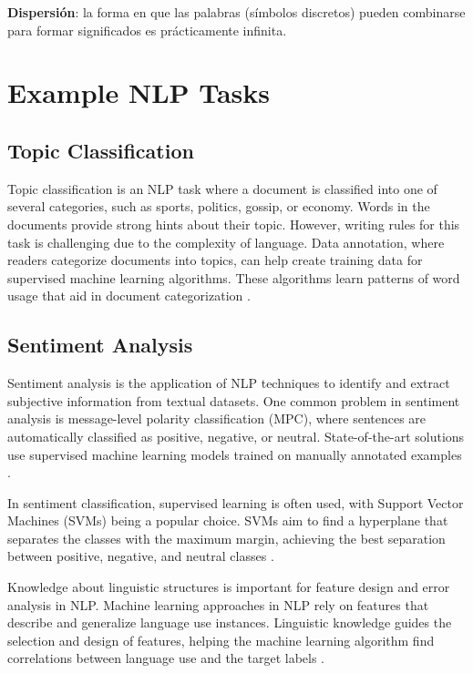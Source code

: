 \documentclass{book}
\begin{document}
\textbf{Dispersión}: la forma en que las palabras (símbolos discretos) pueden combinarse para formar significados es prácticamente infinita.



\section{Example NLP Tasks}

\subsection{Topic Classification}
Topic classification is an NLP task where a document is classified into one of several categories, such as sports, politics, gossip, or economy. Words in the documents provide strong hints about their topic. However, writing rules for this task is challenging due to the complexity of language. Data annotation, where readers categorize documents into topics, can help create training data for supervised machine learning algorithms. These algorithms learn patterns of word usage that aid in document categorization \cite{jacobbook}.

\subsection{Sentiment Analysis}
Sentiment analysis is the application of NLP techniques to identify and extract subjective information from textual datasets. One common problem in sentiment analysis is message-level polarity classification (MPC), where sentences are automatically classified as positive, negative, or neutral. State-of-the-art solutions use supervised machine learning models trained on manually annotated examples \cite{Mohammad2013}.

In sentiment classification, supervised learning is often used, with Support Vector Machines (SVMs) being a popular choice. SVMs aim to find a hyperplane that separates the classes with the maximum margin, achieving the best separation between positive, negative, and neutral classes \cite{jacobbook}.

Knowledge about linguistic structures is important for feature design and error analysis in NLP. Machine learning approaches in NLP rely on features that describe and generalize language use instances. Linguistic knowledge guides the selection and design of features, helping the machine learning algorithm find correlations between language use and the target labels \cite{bender2013linguistic}.
\end{document}
